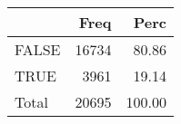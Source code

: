 
\begin{tabular}[t]{lrr}
\toprule
  & Freq & Perc\\
\midrule
FALSE & 16734 & 80.86\\
TRUE & 3961 & 19.14\\
Total & 20695 & 100.00\\
\bottomrule
\end{tabular}